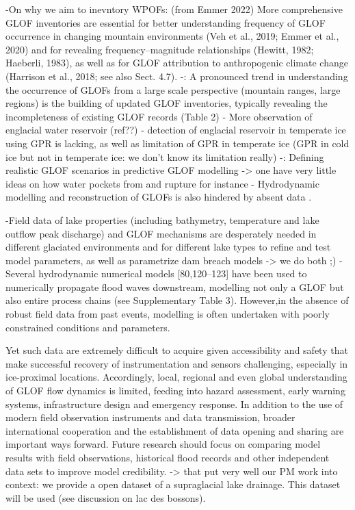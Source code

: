     -On why we aim to inevntory WPOFs: (from Emmer 2022) More comprehensive GLOF inventories are essential for better understanding frequency of GLOF occurrence in changing mountain environments (Veh et al., 2019; Emmer et al., 2020) and for revealing frequency–magnitude relationships (Hewitt, 1982; Haeberli, 1983), as well as for GLOF attribution to anthropogenic climate change (Harrison et al., 2018; see also Sect. 4.7).
    -\cite{Emmer&al2022}: A pronounced trend in understanding the occurrence of GLOFs from a large scale perspective (mountain ranges, large regions) is the building of updated GLOF inventories, typically revealing the incompleteness of existing GLOF records (Table 2)
    - More observation of englacial water reservoir (ref??)
    - detection of englacial reservoir in temperate ice using GPR is lacking, as well as limitation of GPR in temperate ice (GPR in cold ice but not in temperate ice: we don't know its limitation really)
    -\cite{Emmer&al2022}: Defining realistic GLOF scenarios in predictive GLOF modelling -> one have very little ideas on how water pockets from and rupture for instance
    - Hydrodynamic modelling and reconstruction of GLOFs is also hindered by absent data \cite{Zhang&al2024}. 

    -Field data of lake properties (including bathymetry, temperature and lake outflow peak discharge) and GLOF mechanisms are desperately needed in different glaciated environments and for different lake types to refine and test model parameters, as well as parametrize dam breach models \cite{Zhang&al2024} -> we do both ;)
    -\cite{Zhang&al2024}Several hydrodynamic numerical models [80,120–123] have been used to numerically propagate flood waves downstream, modelling not only a GLOF but also entire process chains (see Supplementary Table 3). However,in the absence of robust field data from past events, modelling is often undertaken with poorly constrained conditions and parameters.


Yet such data are extremely difficult to acquire given accessibility and safety that make successful recovery of instrumentation and sensors challenging, especially in ice-proximal locations. Accordingly, local, regional and even global understanding of GLOF flow dynamics is limited, feeding into hazard assessment, early warning systems, infrastructure design and emergency response. 
In addition to the use of modern field observation instruments and data transmission, broader international cooperation and the establishment of data opening and sharing are important ways forward. Future research should focus on comparing model results with field observations, historical flood records and other independent data sets to improve model credibility. -> that put very well our PM work into context: we provide a open dataset of a supraglacial lake drainage. This dataset will be used (see discussion on lac des bossons).


